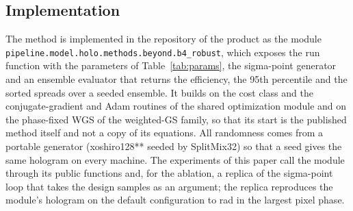 \subsection{Implementation}

The method is implemented in the repository of the product as the module \texttt{pipeline.model.holo.methods.beyond.b4\_robust}, which exposes the run function with the parameters of Table~\ref{tab:params}, the sigma-point generator and an ensemble evaluator that returns the efficiency, the 95th percentile and the sorted spreads
over a seeded ensemble. It builds on the cost class and the conjugate-gradient and Adam routines of the shared optimization module and on the phase-fixed WGS of the weighted-GS family, so that its start is the published method itself and not a copy of its equations. All randomness comes from a portable
generator (xoshiro128** seeded by SplitMix32) so that a seed gives the same hologram on every machine. The experiments of this paper call the module through its public functions and, for the ablation, a replica of the sigma-point loop that takes the design samples as an argument; the replica reproduces the module's hologram on the default
configuration to \replicaDiff{} rad in the largest pixel phase.
